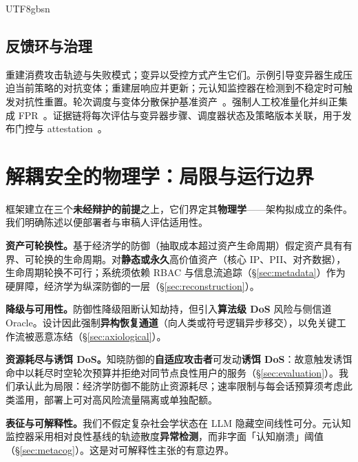 \documentclass[letterpaper,twocolumn,10pt]{article}
\begin{document}
\begin{CJK}{UTF8}{gbsn}




\subsection{反馈环与治理}

重建消费攻击轨迹与失败模式；变异以受控方式产生它们。示例引导变异器生成压迫当前策略的对抗变体；重建层响应并更新；元认知监控器在检测到不稳定时可触发对抗性重置。轮次调度与变体分散保护基准资产~\cite{ControlledMutation_SafetyEval}。强制人工校准量化并纠正集成 FPR~\cite{tc260-governance}。证据链将每次评估与变异器步骤、调度器状态及策略版本关联，用于发布门控与 attestation~\cite{dual-use-attestations,ControlledMutation_SafetyEval}。

\section{解耦安全的物理学：局限与运行边界}
\label{sec:physics}

框架建立在三个\textbf{未经辩护的前提}之上，它们界定其\textbf{物理学}——架构拟成立的条件。我们明确陈述以便部署者与审稿人评估适用性。

\textbf{资产可轮换性。}基于经济学的防御（抽取成本超过资产生命周期）假定资产具有有界、可轮换的生命周期。对\textbf{静态或永久}高价值资产（核心 IP、PII、对齐数据），生命周期轮换不可行；系统须依赖 RBAC 与信息流追踪（\S\ref{sec:metadata}）作为硬屏障，经济学为纵深防御的一层（\S\ref{sec:reconstruction}）。

\textbf{降级与可用性。}防御性降级阻断认知劫持，但引入\textbf{算法级 DoS} 风险与侧信道 Oracle。设计因此强制\textbf{异构恢复通道}（向人类或符号逻辑异步移交），以免关键工作流被恶意冻结（\S\ref{sec:axiological}）。

\textbf{资源耗尽与诱饵 DoS。}知晓防御的\textbf{自适应攻击者}可发动\textbf{诱饵 DoS}：故意触发诱饵命中以耗尽时空轮次预算并拒绝对同节点良性用户的服务（\S\ref{sec:evaluation}）。我们承认此为局限：经济学防御不能防止资源耗尽；速率限制与每会话预算须考虑此类滥用，部署上可对高风险流量隔离或单独配额。

\textbf{表征与可解释性。}我们不假定复杂社会学状态在 LLM 隐藏空间线性可分。元认知监控器采用相对良性基线的轨迹散度\textbf{异常检测}，而非字面「认知崩溃」阈值（\S\ref{sec:metacog}）。这是对可解释性主张的有意边界。


\end{CJK}
\end{document}
